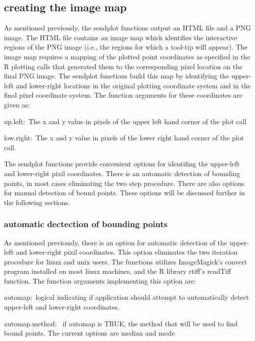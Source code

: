 \documentclass[]{article}
\begin{document}
\subsection{creating the image map}

As mentioned previously, the sendplot functions output an HTML file and a PNG image. The HTML file contains an image map which identifies the interactive regions of the PNG image (i.e., the regions for which a tool-tip will appear). The image map requires a mapping of the plotted point coordinates as specified in the R plotting calls that generated them to the corresponding pixel location on the final PNG image. The sendplot functions build this map by identifying the upper-left and lower-right locations in the original plotting coordinate system and in the final pixel coordinate system. The function arguments for these coordinates are given as:
\begin{description}
  \item{up.left:~}{The x and y value in pixels of the upper left hand
    corner of the plot call}
  \item{low.right:~}{The x and y value in pixels of the lower right hand
    corner of the plot call.}
\end{description}

\indent The sendplot functions provide convenient options for identifing the upper-left and lower-right pixil coordinates. There is an automatic detection of bounding points, in most cases eliminating the two step procedure. There are also options for manual detection of bound points. These options will be discussed further in the following sections.  

\subsubsection{automatic dectection of bounding points}

\indent As mentioned previously, there is an option for automatic detection of the upper-left and lower-right pixil coordinates. This option eliminates the two iteration procedure for linux and unix users. The functions utilizes ImageMagick's convert program installed on most linux machines, and the R library rtiff's readTiff function. The function arguments implementing this option are:
\begin{description}
 \item{automap:~}{logical indicating if application should
    attempt to automatically detect upper-left and lower-right 
    coordinates.}

  \item{automap.method:~ }{if automap is TRUE, the method that will be
    used to find bound points. The current options are median and mode}

 \end{description}
\end{document}
